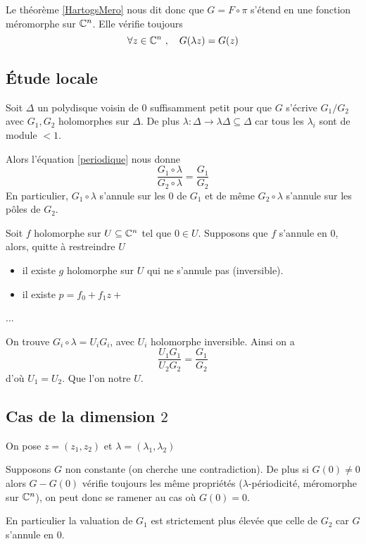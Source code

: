 \documentclass[a4paper]{article}
\begin{document}
Le théorème \ref{HartogsMero} nous dit donc que $G = F \circ \pi$ s'étend en une fonction méromorphe sur $\mathbb{C}^n$. Elle vérifie toujours
\begin{equation}\label{periodique}
\forall z \in \mathbb{C}^n \ , \quad G(\lambda z) = G(z)
\end{equation}

\subsection{Étude locale}
Soit $\Delta$ un polydisque voisin de $0$ suffisamment petit pour que $G$ s'écrive $G_1/G_2$ avec $G_1, G_2$ holomorphes sur $\Delta$.
De plus $\lambda : \Delta \to \lambda\Delta \subseteq \Delta$ car tous les $\lambda_i$ sont de module $<1$.

Alors l'équation \eqref{periodique} nous donne
\[
\dfrac{G_1 \circ \lambda}{G_2 \circ \lambda} = \dfrac{G_1}{G_2}
\]
En particulier, $G_1 \circ \lambda$ s'annule sur les $0$ de $G_1$ et de même $G_2 \circ \lambda$ s'annule sur les pôles de $G_2$.

\begin{thm}
Soit $f$ holomorphe sur $U \subseteq \mathbb{C}^n$ tel que $0 \in U$. Supposons que $f$ s'annule en $0$, alors, quitte à restreindre $U$
\begin{itemize}
\item il existe $g$ holomorphe sur $U$ qui ne s'annule pas (inversible).
\item il existe $p = f_0 + f_1z + $
\end{itemize}
...
\end{thm}

On trouve $G_i \circ \lambda = U_iG_i$, avec $U_i$ holomorphe inversible. Ainsi on a
\[
\dfrac{U_1 G_1}{U_2 G_2} = \dfrac{G_1}{G_2}
\]
d'où $U_1 = U_2$. Que l'on notre $U$.




\subsection*{Cas de la dimension $2$}
On pose $z = (z_1,z_2)$ et $\lambda = (\lambda_1,\lambda_2)$

Supposons $G$ non constante (on cherche une contradiction). De plus si $G(0) \neq 0$ alors $G - G(0)$ vérifie toujours les même propriétés ($\lambda$-périodicité, méromorphe sur $\mathbb{C}^n$), on peut donc se ramener au cas où $G(0) = 0$.

En particulier la valuation de $G_1$ est strictement plus élevée que celle de $G_2$ car $G$ s'annule en $0$. 
\end{document}
